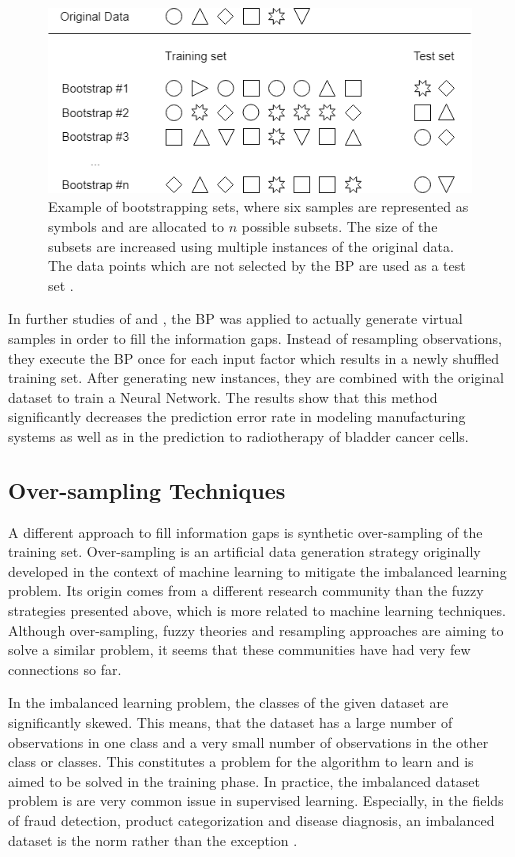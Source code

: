 \documentclass[parskip=full]{scrartcl}
\begin{document}
\begin{figure}[H]
	\centering
	\includegraphics[width=0.6\linewidth]{./resources/bootstrapping_example}
	\caption{Example of bootstrapping sets, where six samples are represented 
	as symbols and are allocated to $\mathit{n}$ possible subsets. The size of 
	the subsets are increased using multiple instances of the original data. 
	The data points which are not selected by the BP are used as a test set 
	\cite{Kuhn.2013}.}
	\label{fig:bootstrappingexample}
\end{figure}

In further studies of \cite{Tsai.2008} and \cite{Chao.2011}, the BP was applied to actually generate 
virtual samples in order to fill the information gaps. Instead of resampling observations, they execute 
the BP once for each input factor which results in a newly shuffled training set. After generating new
instances, they are combined with the original dataset to train a Neural Network. The results show that 
this method significantly decreases the prediction error rate in modeling manufacturing systems as well 
as in the prediction to radiotherapy of bladder cancer cells.

\subsection{Over-sampling Techniques}

A different approach to fill information gaps is synthetic over-sampling of the training set. 
Over-sampling is an artificial data generation strategy originally developed in the context of machine 
learning to mitigate the imbalanced learning problem. Its origin comes from a different research 
community than the fuzzy strategies presented above, which is more related to machine learning
techniques. Although over-sampling, fuzzy theories and resampling approaches are aiming to solve a 
similar problem, it seems that these communities have had very few connections so far. 

In the imbalanced learning problem, the classes of the given dataset are significantly skewed. This 
means, that the dataset has a large number of observations in one class and a very small number of 
observations in the other class or classes. This constitutes a problem for the algorithm to learn and is 
aimed to be solved in the training phase. In practice, the imbalanced dataset problem is are very 
common issue in supervised learning. Especially, in the fields of fraud detection, product categorization 
and disease diagnosis, an imbalanced dataset is the norm rather than the exception \cite{He.2013}. 
\end{document}
